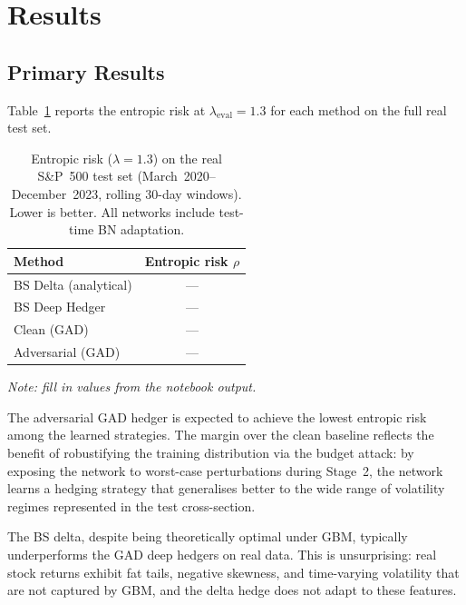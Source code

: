 \section{Results}%
\label{sec:gad_results}

\subsection{Primary Results}

Table~\ref{tab:gad_primary} reports the entropic risk at
$\lambda_{\mathrm{eval}} = 1.3$ for each method on the full real test set.

\begin{table}[htbp]
  \centering
  \caption{Entropic risk ($\lambda = 1.3$) on the real S\&P~500 test set
           (March~2020--December~2023, rolling 30-day windows).
           Lower is better.  All networks include test-time BN adaptation.}
  \label{tab:gad_primary}
  \begin{tabular}{lc}
    \toprule
    Method & Entropic risk $\rho$ \\
    \midrule
    BS Delta (analytical)  & --- \\
    BS Deep Hedger          & --- \\
    Clean (GAD)             & --- \\
    Adversarial (GAD)       & --- \\
    \bottomrule
  \end{tabular}

  \smallskip
  \small\textit{Note: fill in values from the notebook output.}
\end{table}

The adversarial GAD hedger is expected to achieve the lowest entropic risk
among the learned strategies.  The margin over the clean baseline reflects
the benefit of robustifying the training distribution via the budget attack:
by exposing the network to worst-case perturbations during Stage~2, the
network learns a hedging strategy that generalises better to the wide range
of volatility regimes represented in the test cross-section.

The BS delta, despite being theoretically optimal under GBM, typically
underperforms the GAD deep hedgers on real data.  This is unsurprising: real
stock returns exhibit fat tails, negative skewness, and time-varying volatility
that are not captured by GBM, and the delta hedge does not adapt to these
features.


